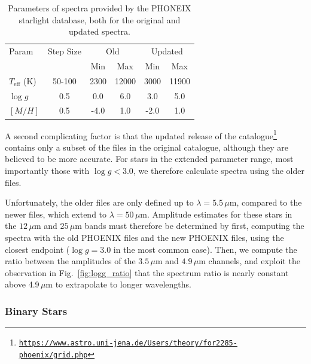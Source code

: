 \documentclass{aa}
\begin{document}
\begin{table}
    \centering
    \begin{tabular}{l c c c c c }
    \hline
    \hline
     Param & Step Size & \multicolumn{2}{c}{Old} & \multicolumn{2}{c}{Updated}\\ 
     & & Min & Max & Min & Max\\
    \hline
    \hline
    $T_{\mathrm{eff}}$ (K) & 50-100 & 2300 & 12000 & 3000 & 11900\\
    $\log g$ & 0.5 & 0.0 & 6.0 & 3.0 & 5.0 \\
    $[M/H]$ & 0.5 & -4.0 & 1.0 & -2.0 & 1.0 \\
     \hline
    \end{tabular}
    \caption{Parameters of spectra provided by the PHONEIX starlight database, both for the original and updated spectra.}
    \label{tab:phoenix}
\end{table}


A second complicating factor is that the updated release of the catalogue\footnote{\href{https://www.astro.uni-jena.de/Users/theory/for2285-phoenix/grid.php}{\texttt{https://www.astro.uni-jena.de/Users/theory/\newline for2285-phoenix/grid.php}}} contains only a subset of the files in the original catalogue, although they are believed to be more accurate. For stars in the extended parameter range, most importantly those with $\log g<3.0$, we therefore calculate spectra using the older files. 

Unfortunately, the older files are only defined up to $\lambda=5.5\,\mu$m, compared to the newer files, which extend to $\lambda=50\,\mu$m. Amplitude estimates for these stars in the $12\,\mu$m and $25\,\mu$m bands must therefore be determined by first, computing the spectra with the old PHOENIX files and the new PHOENIX files, using the closest endpoint ($\log g=3.0$ in the most common case). Then, we compute the ratio between the amplitudes of the $3.5\,\mu$m and $4.9\,\mu$m channels, and exploit the observation in Fig.~\ref{fig:logg_ratio} that the spectrum ratio is nearly constant above 4.9\,$\mu$m to extrapolate to longer wavelengths.




\subsubsection{Binary Stars}
\end{document}
